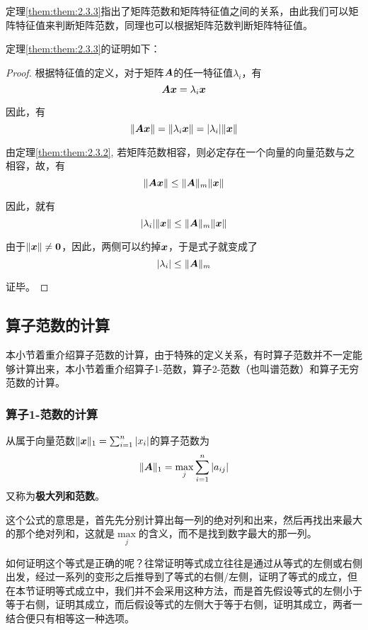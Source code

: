 \documentclass[12pt, a4paper, oneside, UTF8]{ctexbook}
\begin{document}
定理\ref{them:them:2.3.3}指出了矩阵范数和矩阵特征值之间的关系，由此我们可以矩阵特征值来判断矩阵范数，同理也可以根据矩阵范数判断矩阵特征值。

定理\ref{them:them:2.3.3}的证明如下：

\begin{proof}

    根据特征值的定义，对于矩阵$\boldsymbol{A}$的任一特征值$\lambda_i$，有\[\boldsymbol{Ax}=\lambda_i\boldsymbol{x}\]

    因此，有\[\Vert\boldsymbol{Ax}\Vert=\Vert\lambda_i\boldsymbol{x}\Vert=|\lambda_i|\Vert\boldsymbol{x}\Vert\]

    由定理\ref{them:them:2.3.2}, 若矩阵范数相容，则必定存在一个向量的向量范数与之相容，故，有\[\Vert\boldsymbol{Ax}\Vert\leq\Vert\boldsymbol{A}\Vert_m\Vert\boldsymbol{x}\Vert\]

    因此，就有\[|\lambda_i|\Vert\boldsymbol{x}\Vert\leq \Vert\boldsymbol{A}\Vert_m\Vert\boldsymbol{x}\Vert\]

    由于$\Vert\boldsymbol{x}\Vert\neq\boldsymbol{0}$，因此，两侧可以约掉$\boldsymbol{x}$，于是式子就变成了
    \[|\lambda_i|\leq \Vert\boldsymbol{A}\Vert_m\]

    证毕。
\end{proof}

\subsection{算子范数的计算}
本小节着重介绍算子范数的计算，由于特殊的定义关系，有时算子范数并不一定能够计算出来，本小节着重介绍算子1-范数，算子2-范数（也叫谱范数）和算子无穷范数的计算。

\subsubsection{算子1-范数的计算}
从属于向量范数$\Vert\boldsymbol{x}\Vert_1=\sum_{i=1}^{n}|x_i|$的算子范数为\[\Vert\boldsymbol{A}\Vert_1=\max_{j}\sum_{i=1}^{n}|a_{ij}|\]又称为\textbf{极大列和范数}。

这个公式的意思是，首先先分别计算出每一列的绝对列和出来，然后再找出来最大的那个绝对列和，这就是$\max\limits_j$的含义，而不是找到数字最大的那一列。


如何证明这个等式是正确的呢？往常证明等式成立往往是通过从等式的左侧或右侧出发，经过一系列的变形之后推导到了等式的右侧/左侧，证明了等式的成立，但在本节证明等式成立中，我们并不会采用这种方法，而是首先假设等式的左侧小于等于右侧，证明其成立，而后假设等式的左侧大于等于右侧，证明其成立，两者一结合便只有相等这一种选项。
\end{document}
